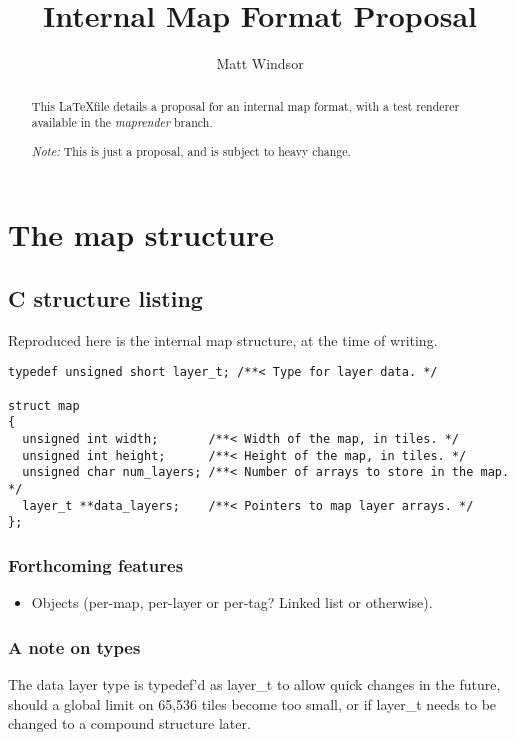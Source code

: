 \documentclass [12pt,a4paper]{article}
\author{Matt Windsor}
\title{Internal Map Format Proposal}
\date{}
\begin{document}
\maketitle{}

\begin{abstract}
  This \LaTeX file details a proposal for an internal map format, with
  a test renderer available in the \emph{maprender} branch.

  \emph{Note:} This is just a proposal, and is subject to heavy
  change.

\end{abstract}

\section{The map structure}

\subsection{C structure listing}

Reproduced here is the internal map structure, at the time of writing.

\begin{lstlisting}
typedef unsigned short layer_t; /**< Type for layer data. */

struct map
{
  unsigned int width;       /**< Width of the map, in tiles. */
  unsigned int height;      /**< Height of the map, in tiles. */
  unsigned char num_layers; /**< Number of arrays to store in the map. */
  layer_t **data_layers;    /**< Pointers to map layer arrays. */
};
\end{lstlisting}

\subsubsection{Forthcoming features}

\begin{itemize}
\item Objects (per-map, per-layer or per-tag? Linked list or
  otherwise).
\end{itemize}

\subsubsection{A note on types}

The data layer type is typedef'd as layer\_t to allow quick changes in
the future, should a global limit on 65,536 tiles become too small, or
if layer\_t needs to be changed to a compound structure later.
\end{document}

